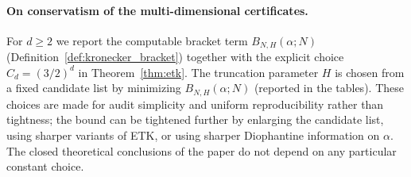 \begin{table}[t]
\centering
{}
\caption{$\zeta(2)$ realized via a two-dimensional scan and an auditable truncation. The total error is decomposed into sampling error (fifth column) and truncation error (sixth column bound). For each $(N,M,K)$ case, the ETK truncation parameter $H$ (second column) is chosen by minimizing the computable Kronecker bracket term $B_{N,H}(\alpha;N)$ (Definition~\ref{def:kronecker_bracket}) over the fixed candidate set $\mathcal{H}_2=\{10,20,30,40,50,80,100,150,200,300,500,800\}$. The last three columns report this $B_{N,H}(\alpha;N)$ (written as $B_{N,H}$ in the table) and the resulting fully numerical sampling certificate obtained from the ETK inequality with the explicit constant $C_2=(3/2)^2=9/4$ (Theorem~\ref{thm:etk}): namely $D_N^\ast(P_N)\le \frac{9}{4}B_{N,H}(\alpha;N)$ and hence $|\overline{\avgN{\mathcal{P}}}_K-H_M^{(2)}|\le \frac{9}{4}\HKVar(g_M)B_{N,H}(\alpha;N)$. The ratio column is $|\overline{\avgN{\mathcal{P}}}_K-H_M^{(2)}|/(\frac{9}{4}\HKVar(g_M)B_{N,H}(\alpha;N))$.}
\label{tab:zeta2_scan}
\end{table}

\paragraph{On conservatism of the multi-dimensional certificates.}
For $d\ge 2$ we report the computable bracket term $B_{N,H}(\alpha;N)$ (Definition~\ref{def:kronecker_bracket}) together with the explicit choice $C_d=(3/2)^d$ in Theorem~\ref{thm:etk}. The truncation parameter $H$ is chosen from a fixed candidate list by minimizing $B_{N,H}(\alpha;N)$ (reported in the tables). These choices are made for audit simplicity and uniform reproducibility rather than tightness; the bound can be tightened further by enlarging the candidate list, using sharper variants of ETK, or using sharper Diophantine information on $\alpha$. The closed theoretical conclusions of the paper do not depend on any particular constant choice.

